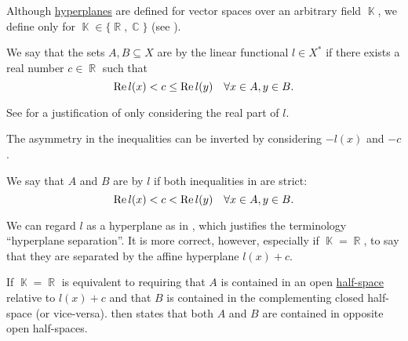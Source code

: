 \begin{definition}\label{def:hyperplane_separation}
  Although \hyperref[def:hyperplane]{hyperplanes} are defined for vector spaces over an arbitrary field \( \BbbK \), we define  only for \( \BbbK \in \{ \BbbR, \BbbC \} \) (see ).

  We say that the sets \( A, B \subseteq X \) are  by the linear functional \( l \in X^* \) if there exists a real number \( c \in \BbbR \) such that
  \begin{equation}\label{def:hyperplane_separation/normal}
    \operatorname{Re} l(x) < c \leq \operatorname{Re} l(y) \quad\forall x \in A, y \in B.
  \end{equation}

  See  for a justification of only considering the real part of \( l \).

  The asymmetry in the inequalities  can be inverted by considering \( -l(x) \) and \( -c \).

  We say that \( A \) and \( B \) are  by \( l \) if both inequalities in  are strict:
  \begin{equation}\label{def:hyperplane_separation/strong}
    \operatorname{Re} l(x) < c < \operatorname{Re} l(y) \quad\forall x \in A, y \in B.
  \end{equation}

  We can regard \( l \) as a hyperplane as in , which justifies the terminology \enquote{hyperplane separation}. It is more correct, however, especially if \( \BbbK = \BbbR \), to say that they are separated by the affine hyperplane \( l(x) + c \).

  If \( \BbbK = \BbbR \)  is equivalent to requiring that \( A \) is contained in an open \hyperref[def:half_space]{half-space} relative to \( l(x) + c \) and that \( B \) is contained in the complementing closed half-space (or vice-versa).  then states that both \( A \) and \( B \) are contained in opposite open half-spaces.
\end{definition}

